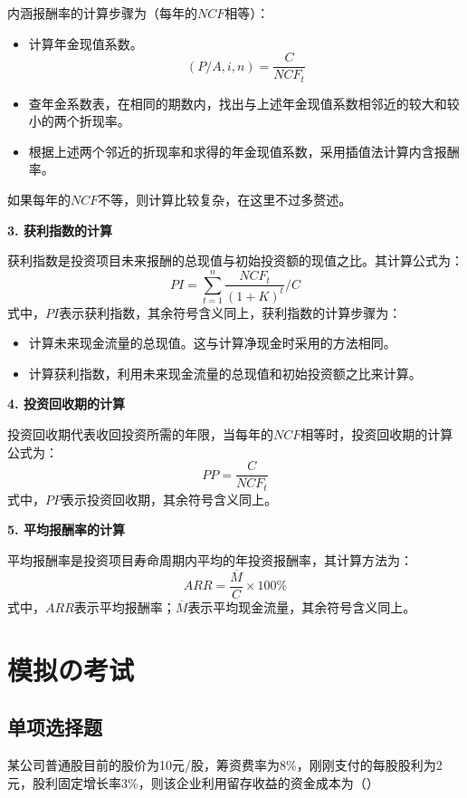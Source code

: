 \documentclass[
  10pt,
  twoside,
  openany,
  b5paper, %
  colorscheme = black, %
  xits = false,
]{qyxf-book}
\begin{document}
内涵报酬率的计算步骤为（每年的$NCF$相等）：
\begin{itemize}
	\item 计算年金现值系数。
	\begin{equation*}
		(P/A,i,n) = \frac{C}{NCF_t}
	\end{equation*}
	\item 查年金系数表，在相同的期数内，找出与上述年金现值系数相邻近的较大和较小的两个折现率。
	\item 根据上述两个邻近的折现率和求得的年金现值系数，采用插值法计算内含报酬率。
\end{itemize}

如果每年的$NCF$不等，则计算比较复杂，在这里不过多赘述。

\textbf{3. 获利指数的计算}

获利指数是投资项目未来报酬的总现值与初始投资额的现值之比。其计算公式为：
\begin{equation*}
	PI = \sum_{t=1}^{n}\frac{NCF_t}{(1+K)^t}/C
\end{equation*}
式中，$PI$表示获利指数，其余符号含义同上，获利指数的计算步骤为：
\begin{itemize}
	\item 计算未来现金流量的总现值。这与计算净现金时采用的方法相同。
	\item 计算获利指数，利用未来现金流量的总现值和初始投资额之比来计算。
\end{itemize}

\textbf{4. 投资回收期的计算}

投资回收期代表收回投资所需的年限，当每年的$NCF$相等时，投资回收期的计算公式为：
\begin{equation*}
	PP = \frac{C}{NCF_t}
\end{equation*}
式中，$PP$表示投资回收期，其余符号含义同上。

\textbf{5. 平均报酬率的计算}

平均报酬率是投资项目寿命周期内平均的年投资报酬率，其计算方法为：
\begin{equation*}
	ARR = \frac{\overline{M}}{C} \times 100\%
\end{equation*}
式中，$ARR$表示平均报酬率；$\overline{M}$表示平均现金流量，其余符号含义同上。

\chapter{模拟の考试}
\section{单项选择题}
 某公司普通股目前的股价为10元/股，筹资费率为8\%，刚刚支付的每股股利为2元，股利固定增长率3\%，则该企业利用留存收益的资金成本为（\qquad）
\end{document}
